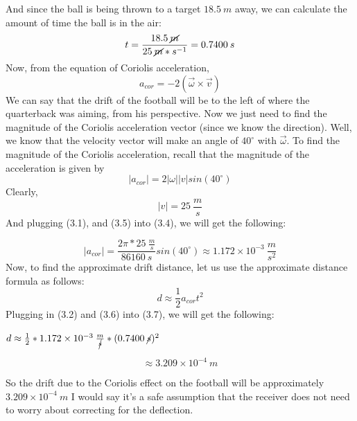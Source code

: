 \documentclass{article}
\begin{document}
And since the ball is being thrown to a target $18.5\:m$ away, we can calculate the amount of time the ball is in the air:
\begin{equation}
    t = \frac{18.5\:\cancel{m}}{25\:\cancel{m}*s^{-1}} = 0.7400\:s
\end{equation}
Now, from the equation of Coriolis acceleration,
\begin{equation}
    a_{cor} = -2(\vec{\omega}\times\vec{v})
\end{equation}
We can say that the drift of the football will be to the left of where the quarterback was aiming, from his perspective. Now we just need to find the magnitude of the Coriolis acceleration vector (since we know the direction).
\newline
Well, we know that the velocity vector will make an angle of $40^{\circ}$ with $\vec{\omega}$.
\newline\newline
To find the magnitude of the Coriolis acceleration, recall that the magnitude of the acceleration is given by 
\begin{equation}
    |a_{cor}| = 2|\omega||v|sin(40^{\circ})
\end{equation}
Clearly,
\begin{equation}
    |v| = 25\:\frac{m}{s}
\end{equation}
And plugging (3.1), and (3.5) into (3.4), we will get the following:

\begin{equation}
    |a_{cor}| = \frac{2\pi*25\:\frac{m}{s}}{86160\:s}sin(40^{\circ})\approx 1.172\times10^{-3}\:\frac{m}{s^2}
\end{equation}
Now, to find the approximate drift distance, let us use the approximate distance formula as follows:
\begin{equation}
    d \approx \frac{1}{2}a_{cor}t^2
\end{equation}
Plugging in (3.2) and (3.6) into (3.7), we will get the following:
\begin{center}
    $d \approx \frac{1}{2}*1.172\times10^{-3}\:\frac{m}{\cancel{s}}*(0.7400\:\cancel{s})^2$
\end{center}
\begin{equation}
    \approx 3.209\times10^{-4}\:m
\end{equation}


So the drift due to the Coriolis effect on the football will be approximately $3.209\times10^{-4} \: m$
\newline
I would say it's a safe assumption that the receiver does not need to worry about correcting for the deflection.
\end{document}
